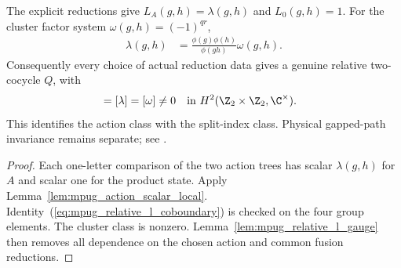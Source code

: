 \begin{lemma}
    \label{lem:mpug_controlled_z_relative_l_class}
    \leanok
    The explicit reductions give $L_A(g,h)=\lambda(g,h)$ and $L_0(g,h)=1$.
    For the cluster factor system $\omega(g,h)=(-1)^{qr}$,
    \begin{align}
        \lambda(g,h) & =\frac{\phi(g)\phi(h)}{\phi(gh)}\omega(g,h).
        \label{eq:mpug_relative_l_coboundary}
    \end{align}
    Consequently every choice of actual reduction data gives a genuine
    relative two-cocycle $Q$, with
    \begin{align}
        [Q] & =[\lambda]=[\omega]\ne0
        \quad\hbox{in }H^2(\Z_2\times\Z_2,\C^\times).
    \end{align}
    This identifies the action class with the split-index class. Physical
    gapped-path invariance remains separate; see
    \cite{gap:fbc25_controlled_z_split_index_class_scope}.
\end{lemma}
\begin{proof}\leanok
    Each one-letter comparison of the two action trees has scalar
    $\lambda(g,h)$ for $A$ and scalar one for the product state. Apply
    Lemma~\ref{lem:mpug_action_scalar_local}. Identity~(\ref{eq:mpug_relative_l_coboundary})
    is checked on the four group elements. The cluster class is
    nonzero. Lemma~\ref{lem:mpug_relative_l_gauge} then removes all dependence
    on the chosen action and common fusion reductions.
\end{proof}


